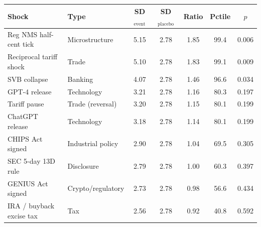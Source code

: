 \begin{tabular}{llccccc}
\toprule
Shock & Type & SD$_{\text{event}}$ & SD$_{\text{placebo}}$ & Ratio & Pctile & $p$ \\
\midrule
Reg NMS half-cent tick & Microstructure & 5.15 & 2.78 & 1.85 & 99.4 & 0.006 \\
Reciprocal tariff shock & Trade & 5.10 & 2.78 & 1.83 & 99.1 & 0.009 \\
SVB collapse & Banking & 4.07 & 2.78 & 1.46 & 96.6 & 0.034 \\
GPT-4 release & Technology & 3.21 & 2.78 & 1.16 & 80.3 & 0.197 \\
Tariff pause & Trade (reversal) & 3.20 & 2.78 & 1.15 & 80.1 & 0.199 \\
ChatGPT release & Technology & 3.18 & 2.78 & 1.14 & 80.1 & 0.199 \\
CHIPS Act signed & Industrial policy & 2.90 & 2.78 & 1.04 & 69.5 & 0.305 \\
SEC 5-day 13D rule & Disclosure & 2.79 & 2.78 & 1.00 & 60.3 & 0.397 \\
GENIUS Act signed & Crypto/regulatory & 2.73 & 2.78 & 0.98 & 56.6 & 0.434 \\
IRA / buyback excise tax & Tax & 2.56 & 2.78 & 0.92 & 40.8 & 0.592 \\
\bottomrule
\end{tabular}